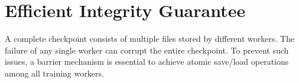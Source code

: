 


\section{Efficient Integrity Guarantee}
\label{sec:barrier_check}

A complete checkpoint consists of multiple files stored by different workers. The failure of any single worker can corrupt the entire checkpoint.
To prevent such issues, a barrier mechanism is essential to achieve atomic save/load operations among all training workers. 

